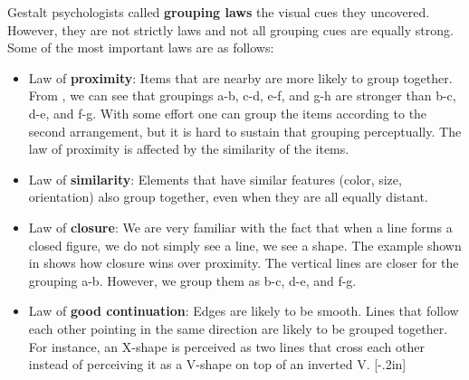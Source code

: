 Gestalt psychologists called {\bf grouping laws} 
the visual cues they uncovered. However, they are not strictly laws and not all grouping cues are equally strong. Some of the most important laws are as follows:
\begin{itemize}
    \item Law of {\bf proximity}: Items that are nearby are more likely to group together. From \fig{\ref{fig:gestalt}}, we can see that groupings a-b, c-d, e-f, and g-h are stronger than b-c, d-e, and f-g. With some effort one can group the items according to the second arrangement, but it is hard to sustain that grouping perceptually. The law of proximity is affected by the similarity of the items. 
    \item Law of {\bf similarity}: Elements that have similar features (color, size, orientation) also group together, even when they are all equally distant. 
    \item Law of {\bf closure}: We are very familiar with the fact that when a line forms a closed figure, we do not simply see a line, we see a shape. The example shown in \fig{\ref{fig:gestalt}} shows how closure wins over proximity. The vertical lines are closer for the grouping a-b. However, we group them as b-c, d-e, and f-g. 
\item Law of {\bf good continuation}: Edges are likely to be smooth. Lines that follow each other pointing in the same direction are likely to be grouped together. For instance, an X-shape is perceived as two lines that cross each other instead of perceiving it as a V-shape on top of an inverted V.
[-.2in]


\end{itemize}
